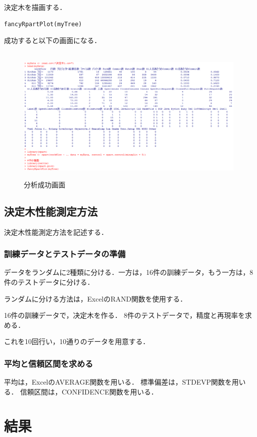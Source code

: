 決定木を描画する．
{
\small
\begin{verbatim}
fancyRpartPlot(myTree)
\end{verbatim}
}
成功すると以下の画面になる．
\begin{figure}[H]
\centering　
\includegraphics[width=13cm]{R.png}
\caption{分析成功画面}\label{R}
\end{figure}






\section{決定木性能測定方法}

決定木性能測定方法を記述する．


\subsection{訓練データとテストデータの準備}
データをランダムに2種類に分ける．一方は，16件の訓練データ，もう一方は，8件のテストデータに分ける．

ランダムに分ける方法は，ExcelのRAND関数を使用する．

16件の訓練データで，决定木を作る．
8件のテストデータで，精度と再現率を求める．


これを10回行い，10通りのデータを用意する．

\subsection{平均と信頼区間を求める}
平均は，ExcelのAVERAGE関数を用いる．
標準偏差は，STDEVP関数を用いる．
信頼区間は，CONFIDENCE関数を用いる．


\chapter{結果}

